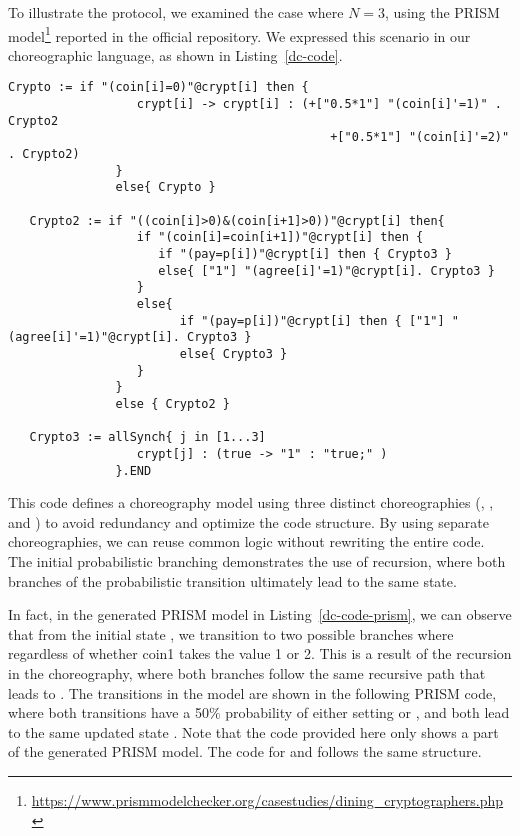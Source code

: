 To illustrate the protocol, we examined the case where $N=3$, using the PRISM model\footnote{\url{https://www.prismmodelchecker.org/casestudies/dining_cryptographers.php}} reported in the official repository. We expressed this scenario in our choreographic language, as shown in Listing~\ref{dc-code}.
\begin{lstlisting}[style=chor-color,caption={Choreography for the Dining Cryptographers Protocol},captionpos=b,label={dc-code}]
   Crypto := if "(coin[i]=0)"@crypt[i] then {
                  crypt[i] -> crypt[i] : (+["0.5*1"] "(coin[i]'=1)" . Crypto2
                                             +["0.5*1"] "(coin[i]'=2)" . Crypto2) 
               }
               else{ Crypto }

   Crypto2 := if "((coin[i]>0)&(coin[i+1]>0))"@crypt[i] then{
                  if "(coin[i]=coin[i+1])"@crypt[i] then {
                     if "(pay=p[i])"@crypt[i] then { Crypto3 }
                     else{ ["1"] "(agree[i]'=1)"@crypt[i]. Crypto3 }
                  }
                  else{
                        if "(pay=p[i])"@crypt[i] then { ["1"] "(agree[i]'=1)"@crypt[i]. Crypto3 }
                        else{ Crypto3 }
                  }
               }
               else { Crypto2 }

   Crypto3 := allSynch{ j in [1...3]
                  crypt[j] : (true -> "1" : "true;" )
               }.END
\end{lstlisting}
This code defines a choreography model using three distinct choreographies (, , and ) to avoid redundancy and optimize the code structure. By using separate choreographies, we can reuse common logic without rewriting the entire code.
The initial probabilistic branching demonstrates the use of recursion, where both branches of the probabilistic transition ultimately lead to the same state. 

In fact, in the generated PRISM model in Listing~\ref{dc-code-prism}, we can observe that from the initial state , we transition to two possible branches where  regardless of whether coin1 takes the value 1 or 2. This is a result of the recursion in the choreography, where both branches follow the same recursive path that leads to . The transitions in the model are shown in the following PRISM code, where both transitions have a 50$\%$ probability of either setting  or , and both lead to the same updated state . Note that the code provided here only shows a part of the generated PRISM model. The code for  and  follows the same structure.

